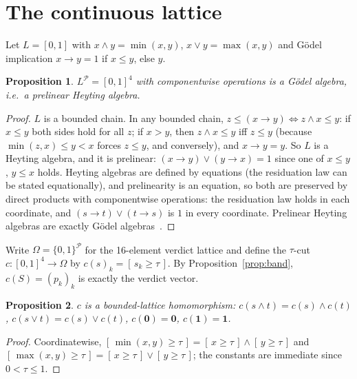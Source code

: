 \documentclass[11pt]{article}
\newtheorem{proposition}{Proposition}
\theoremstyle{remark}
\newcommand{\ind}[1]{[\,#1\,]}
\begin{document}
\section{The continuous lattice}\label{sec:lattice}

Let $L = [0,1]$ with $x \wedge y = \min(x,y)$, $x \vee y = \max(x,y)$ and Gödel
implication $x \to y = 1$ if $x \le y$, else $y$.

\begin{proposition}
$L^{\mathcal P} = [0,1]^4$ with componentwise operations is a Gödel algebra,
i.e.\ a prelinear Heyting algebra.
\end{proposition}

\begin{proof}
$L$ is a bounded chain. In any bounded chain, $z \le (x \to y) \iff
z \wedge x \le y$: if $x \le y$ both sides hold for all $z$; if $x > y$, then
$z \wedge x \le y$ iff $z \le y$ (because $\min(z,x) \le y < x$ forces $z \le y$,
and conversely), and $x \to y = y$. So $L$ is a Heyting algebra, and it is
prelinear: $(x \to y) \vee (y \to x) = 1$ since one of $x \le y$, $y \le x$
holds. Heyting algebras are defined by equations (the residuation law can be
stated equationally), and prelinearity is an equation, so both are preserved
by direct products with componentwise operations: the residuation law holds in
each coordinate, and $(s \to t) \vee (t \to s)$ is $1$ in every coordinate.
Prelinear Heyting algebras are exactly Gödel algebras~\cite{hajek1998}.
\end{proof}

Write $\Omega = \{0,1\}^{\mathcal P}$ for the 16-element verdict lattice and
define the $\tau$-cut $c : [0,1]^4 \to \Omega$ by $c(s)_k = \ind{s_k \ge \tau}$.
By Proposition~\ref{prop:band}, $c(S) = (p_k)_k$ is exactly the verdict vector.

\begin{proposition}
$c$ is a bounded-lattice homomorphism: $c(s \wedge t) = c(s) \wedge c(t)$,
$c(s \vee t) = c(s) \vee c(t)$, $c(\mathbf 0) = \mathbf 0$, $c(\mathbf 1) = \mathbf 1$.
\end{proposition}

\begin{proof}
Coordinatewise, $\ind{\min(x,y) \ge \tau} = \ind{x \ge \tau} \wedge
\ind{y \ge \tau}$ and $\ind{\max(x,y) \ge \tau} = \ind{x \ge \tau} \vee
\ind{y \ge \tau}$; the constants are immediate since $0 < \tau \le 1$.
\end{proof}
\end{document}
